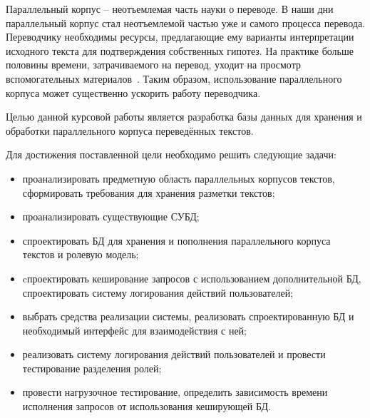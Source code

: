 
Параллельный корпус -- неотъемлемая часть науки о переводе. 
В наши дни параллельный корпус стал неотъемлемой частью уже и самого процесса перевода. Переводчику необходимы ресурсы, предлагающие ему варианты интерпретации исходного текста для подтверждения собственных гипотез. 
На практике больше половины времени, затрачиваемого на перевод, уходит на просмотр вспомогательных материалов~\cite{rura-tranlator-aid-2008}. 
Таким образом, использование параллельного корпуса может существенно ускорить работу переводчика.

Целью данной курсовой работы является разработка базы данных для хранения и обработки параллельного корпуса переведённых текстов.

Для достижения поставленной цели необходимо решить следующие задачи:

\begin{itemize}[label=---]
	\item проанализировать предметную область параллельных корпусов текстов, сформировать требования для хранения разметки текстов;
	
	\item проанализировать существующие СУБД;
	
	\item спроектировать БД для хранения и пополнения параллельного корпуса текстов и ролевую модель;
	
	\item cпроектировать кеширование запросов с использованием дополнительной БД, спроектировать систему логирования действий пользователей;
	
	\item выбрать средства реализации системы, реализовать спроектированную БД и необходимый интерфейс для взаимодействия с ней;
	
	\item реализовать систему логирования действий пользователей и провести тестирование разделения ролей;
	
	\item провести нагрузочное тестирование, определить зависимость времени исполнения запросов от использования кеширующей БД.
\end{itemize}

\pagebreak
